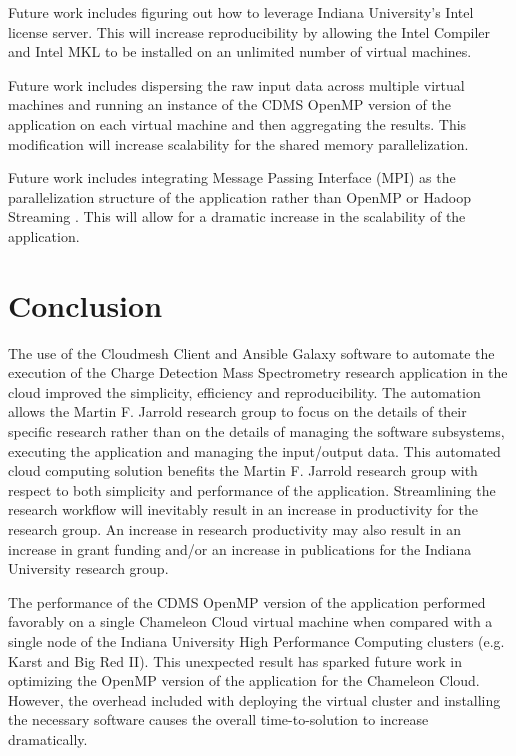 \documentclass[9pt,twocolumn,twoside]{../../styles/osajnl}
\begin{document}
Future work includes figuring out how to leverage Indiana University's
Intel license server. This will increase reproducibility by allowing
the Intel Compiler and Intel MKL to be installed on an unlimited
number of virtual machines.

Future work includes dispersing the raw input data across multiple
virtual machines and running an instance of the CDMS OpenMP version of
the application on each virtual machine and then aggregating the
results. This modification will increase scalability for the shared
memory parallelization.

Future work includes integrating Message Passing Interface (MPI) as
the parallelization structure of the application rather than OpenMP or
Hadoop Streaming \cite{www-mpi}. This will allow for a dramatic
increase in the scalability of the application.

\section{Conclusion} \label{conclusion}
The use of the Cloudmesh Client and Ansible Galaxy software to
automate the execution of the Charge Detection Mass Spectrometry
research application in the cloud improved the simplicity, efficiency
and reproducibility. The automation allows the Martin F. Jarrold
research group to focus on the details of their specific research
rather than on the details of managing the software subsystems,
executing the application and managing the input/output data. This
automated cloud computing solution benefits the Martin F. Jarrold
research group with respect to both simplicity and performance of the
application. Streamlining the research workflow will inevitably result
in an increase in productivity for the research group. An increase in
research productivity may also result in an increase in grant funding
and/or an increase in publications for the Indiana University research
group.

The performance of the CDMS OpenMP version of the application
performed favorably on a single Chameleon Cloud virtual machine when
compared with a single node of the Indiana University High Performance
Computing clusters (e.g. Karst and Big Red II). This unexpected result
has sparked future work in optimizing the OpenMP version of the
application for the Chameleon Cloud. However, the overhead included
with deploying the virtual cluster and installing the necessary
software causes the overall time-to-solution to increase dramatically.
\end{document}
